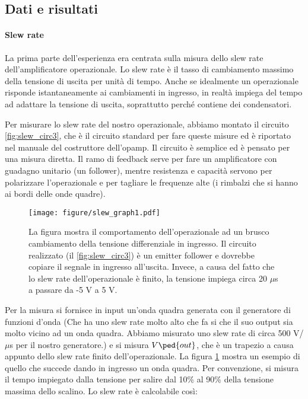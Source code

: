 \subsection{Dati e risultati}

\paragraph{Slew rate}

La prima parte dell'esperienza era centrata sulla misura dello slew rate
dell'amplificatore operazionale. Lo slew rate è il tasso di cambiamento massimo
della tensione di uscita per unità di tempo. Anche se idealmente un operazionale
risponde istantaneamente ai cambiamenti in ingresso, in realtà impiega del tempo
ad adattare la tensione di uscita, soprattutto perché contiene dei condensatori.

Per misurare lo slew rate del nostro operazionale, abbiamo montato il circuito
\ref{fig:slew_circ3}, che è il circuito standard per fare queste misure ed
è riportato nel manuale del costruttore dell'opamp. Il circuito è semplice ed è pensato
per una misura diretta. Il ramo di feedback serve per fare un amplificatore 
con guadagno unitario (un follower), mentre resistenza e capacità servono per polarizzare
l'operazionale e per tagliare le frequenze alte (i rimbalzi che si hanno ai bordi delle onde quadre).

\begin{figure}[t!]
    \texttt{[image: figure/slew\_graph1.pdf]}
    \caption{La figura mostra il comportamento dell'operazionale ad un brusco cambiamento della tensione
        differenziale in ingresso. Il circuito realizzato (il \ref{fig:slew_circ3}) è un emitter follower
        e dovrebbe copiare il segnale in ingresso all'uscita. Invece, a causa del fatto che lo slew rate
        dell'operazionale è finito, la tensione impiega circa 20 $\mu$s a passare da -5 V a 5 V.}
    \label{fig:slew_graph3}
\end{figure}

Per la misura si fornisce in input un'onda quadra generata con il generatore
di funzioni d'onda (Che ha uno slew rate molto alto che fa si che il suo output sia
molto vicino ad un onda quadra. Abbiamo misurato uno slew rate di circa 500 V/$\mu$s per
il nostro generatore.) e si misura $V\ped{out}$, che è un trapezio a causa appunto dello
slew rate finito dell'operazionale. La figura  \ref{fig:slew_graph3} mostra un esempio
di quello che succede dando in ingresso un onda quadra.
Per convenzione, si misura il tempo impiegato
dalla tensione per salire dal 10\% al 90\% della tensione massima dello scalino.
Lo slew rate è calcolabile così:

